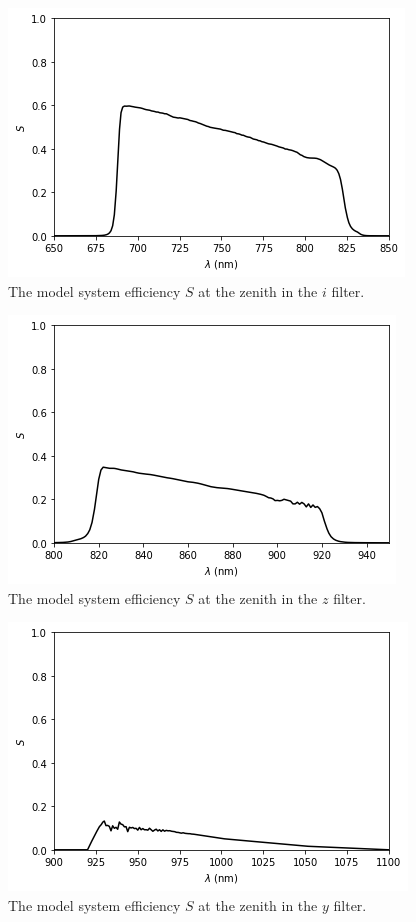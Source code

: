 \begin{figure}
\begin{center}
\includegraphics[width=0.7\linewidth]{figures/huitzi-f20-S-i.png}
\medskip
\caption{The model system efficiency $S$ at the zenith in the $i$ filter.}
\end{center}
\end{figure}

\begin{figure}
\begin{center}
\includegraphics[width=0.7\linewidth]{figures/huitzi-f20-S-z.png}
\medskip
\caption{The model system efficiency $S$ at the zenith in the $z$ filter.}
\end{center}
\end{figure}

\begin{figure}
\begin{center}
\includegraphics[width=0.7\linewidth]{figures/huitzi-f20-S-y.png}
\medskip
\caption{The model system efficiency $S$ at the zenith in the $y$ filter.}
\end{center}
\end{figure}

